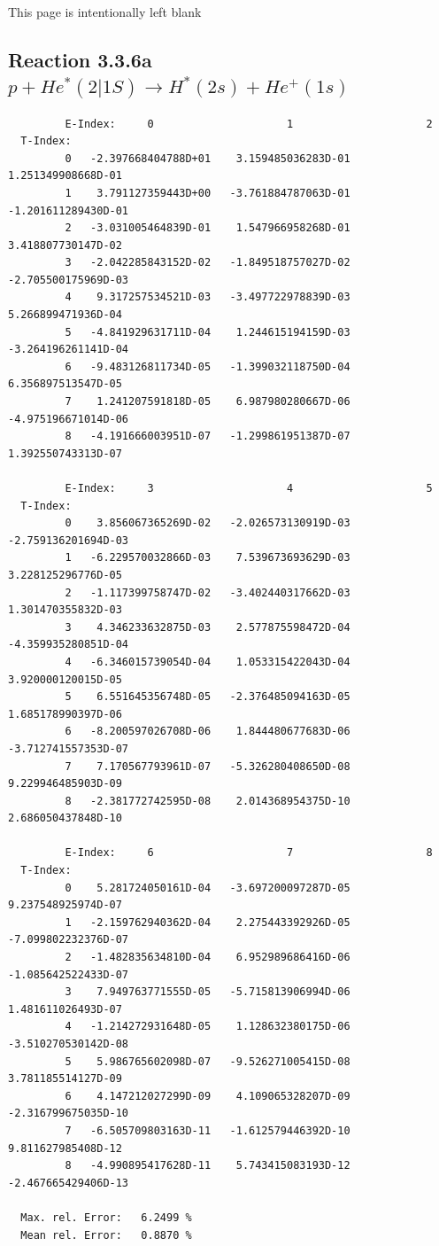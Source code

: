 \documentclass[12pt,dvips]{article}
\begin{document}
\newpage
This page is intentionally left blank
\newpage

\subsection{
Reaction 3.3.6a $   p + He^*(2|1S) \rightarrow H^*(2s) + He^+(1s) $
}


\begin{small}\begin{verbatim}
         E-Index:     0                     1                     2
  T-Index:
         0   -2.397668404788D+01    3.159485036283D-01    1.251349908668D-01
         1    3.791127359443D+00   -3.761884787063D-01   -1.201611289430D-01
         2   -3.031005464839D-01    1.547966958268D-01    3.418807730147D-02
         3   -2.042285843152D-02   -1.849518757027D-02   -2.705500175969D-03
         4    9.317257534521D-03   -3.497722978839D-03    5.266899471936D-04
         5   -4.841929631711D-04    1.244615194159D-03   -3.264196261141D-04
         6   -9.483126811734D-05   -1.399032118750D-04    6.356897513547D-05
         7    1.241207591818D-05    6.987980280667D-06   -4.975196671014D-06
         8   -4.191666003951D-07   -1.299861951387D-07    1.392550743313D-07

         E-Index:     3                     4                     5
  T-Index:
         0    3.856067365269D-02   -2.026573130919D-03   -2.759136201694D-03
         1   -6.229570032866D-03    7.539673693629D-03    3.228125296776D-05
         2   -1.117399758747D-02   -3.402440317662D-03    1.301470355832D-03
         3    4.346233632875D-03    2.577875598472D-04   -4.359935280851D-04
         4   -6.346015739054D-04    1.053315422043D-04    3.920000120015D-05
         5    6.551645356748D-05   -2.376485094163D-05    1.685178990397D-06
         6   -8.200597026708D-06    1.844480677683D-06   -3.712741557353D-07
         7    7.170567793961D-07   -5.326280408650D-08    9.229946485903D-09
         8   -2.381772742595D-08    2.014368954375D-10    2.686050437848D-10

         E-Index:     6                     7                     8
  T-Index:
         0    5.281724050161D-04   -3.697200097287D-05    9.237548925974D-07
         1   -2.159762940362D-04    2.275443392926D-05   -7.099802232376D-07
         2   -1.482835634810D-04    6.952989686416D-06   -1.085642522433D-07
         3    7.949763771555D-05   -5.715813906994D-06    1.481611026493D-07
         4   -1.214272931648D-05    1.128632380175D-06   -3.510270530142D-08
         5    5.986765602098D-07   -9.526271005415D-08    3.781185514127D-09
         6    4.147212027299D-09    4.109065328207D-09   -2.316799675035D-10
         7   -6.505709803163D-11   -1.612579446392D-10    9.811627985408D-12
         8   -4.990895417628D-11    5.743415083193D-12   -2.467665429406D-13

  Max. rel. Error:   6.2499 %
  Mean rel. Error:   0.8870 %


\end{verbatim}\end{small}
\end{document}
